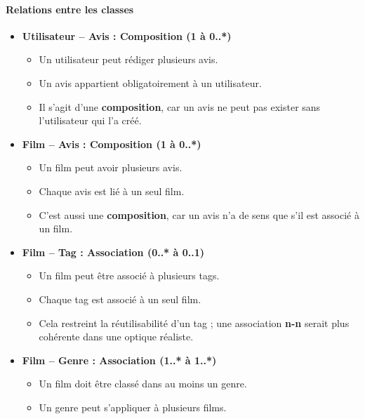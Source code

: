 \documentclass{article}
\begin{document}
\paragraph{Relations entre les classes}

\begin{itemize}
    \item \textbf{Utilisateur -- Avis : Composition (1 à 0..*)}
    \begin{itemize}
        \item Un utilisateur peut rédiger plusieurs avis.
        \item Un avis appartient obligatoirement à un utilisateur.
        \item Il s’agit d’une \textbf{composition}, car un avis ne peut pas exister sans l’utilisateur qui l’a créé.
    \end{itemize}

    \item \textbf{Film -- Avis : Composition (1 à 0..*)}
    \begin{itemize}
        \item Un film peut avoir plusieurs avis.
        \item Chaque avis est lié à un seul film.
        \item C’est aussi une \textbf{composition}, car un avis n’a de sens que s’il est associé à un film.
    \end{itemize}

    \item \textbf{Film -- Tag : Association (0..* à 0..1)}
    \begin{itemize}
        \item Un film peut être associé à plusieurs tags.
        \item Chaque tag est associé à un seul film.
        \item Cela restreint la réutilisabilité d’un tag ; une association \textbf{n-n} serait plus cohérente dans une optique réaliste.
    \end{itemize}

    \item \textbf{Film -- Genre : Association (1..* à 1..*)}
    \begin{itemize}
        \item Un film doit être classé dans au moins un genre.
        \item Un genre peut s’appliquer à plusieurs films.
    \end{itemize}
\end{itemize}
\end{document}
